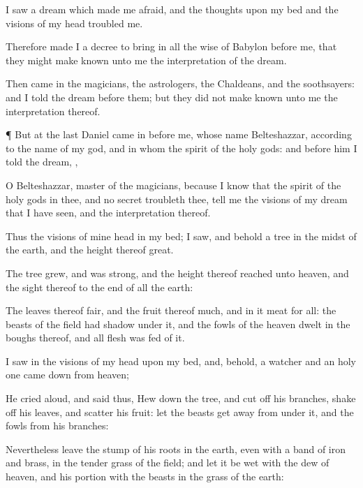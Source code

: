 {I
saw a
dream which made me
afraid, and the
thoughts
upon my
bed and the
visions of my
head
troubled me.

Therefore
made
I a
decree to
bring in
all the
wise
{} of
Babylon
before me, that they might make
known unto me the
interpretation of the
dream.

Then
came in the
magicians, the
astrologers, the
Chaldeans, and the
soothsayers: and
I
told the
dream
before them; but they did
not make
known unto me the
interpretation thereof.


\par }{\PP {}¶ But
at the
last
Daniel came
in before
me, whose
name
{}
Belteshazzar, according to the
name of my
god, and in whom
{} the
spirit of the
holy
gods: and
before him I
told the
dream,
{},

O
Belteshazzar,
master of the
magicians, because
I
know that the
spirit of the
holy
gods
{} in thee, and
no
secret
troubleth thee,
tell me the
visions of my
dream that I have
seen, and the
interpretation thereof.

Thus
{} the
visions of mine
head
in my
bed; I
saw, and
behold a
tree in the
midst of the
earth, and the
height thereof
{}
great.

The
tree
grew, and was
strong, and the
height thereof
reached unto
heaven, and the
sight thereof to the
end of
all the
earth:

The
leaves thereof
{}
fair, and the
fruit thereof
much, and in it
{}
meat for
all: the
beasts of the
field had
shadow
under it, and the
fowls of the
heaven
dwelt in the
boughs thereof, and
all
flesh was
fed of
it.

I
saw in the
visions of my
head
upon my
bed, and,
behold, a
watcher and an holy
one came
down
from
heaven;

He
cried
aloud, and
said
thus, Hew
down the
tree, and cut
off his
branches, shake
off his
leaves, and
scatter his
fruit: let the
beasts get
away
from under
it, and the
fowls
from his
branches:

Nevertheless
leave the
stump of his
roots in the
earth, even with a
band of
iron and
brass, in the tender
grass of the
field; and let it be
wet with the
dew of
heaven, and
{} his
portion
{}
with the
beasts in the
grass of the
earth:

}
